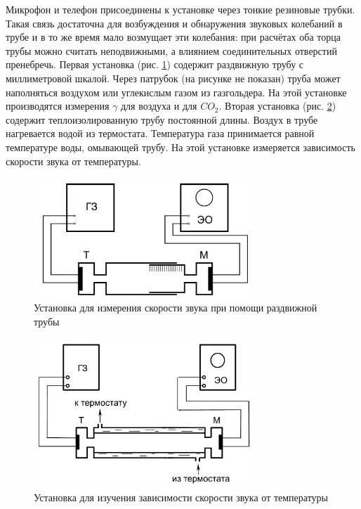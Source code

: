 \documentclass[12pt]{article}
\begin{document}
	
		Микрофон и телефон присоединены к установке через тонкие резиновые трубки. Такая связь достаточна для возбуждения и обнаружения звуковых колебаний в трубе и в то же время мало возмущает эти колебания: при расчётах оба торца трубы можно считать неподвижными, а влиянием соединительных отверстий
		пренебречь. Первая установка (рис. \ref{pic1}) содержит раздвижную трубу с миллиметровой шкалой. Через патрубок (на рисунке не показан) труба может наполняться воздухом или углекислым газом из газгольдера. На этой установке производятся измерения $\gamma$ для воздуха и для $CO_2$. Вторая установка (рис. \ref{pic2}) содержит теплоизолированную трубу постоянной длины. Воздух в трубе нагревается водой из термостата. Температура газа принимается равной температуре воды, омывающей трубу. На этой установке измеряется зависимость скорости звука от температуры.


		\begin{figure}[h!]
			\begin{center}				
			\includegraphics[width=0.75\textwidth]{pic1}
		\end{center}
			\caption{Установка для измерения скорости звука при помощи раздвижной трубы}\label{pic1}

		\end{figure}
	
		\begin{figure}[h!]
			\begin{center}
			\includegraphics[width=0.75\textwidth]{pic2}
			\caption{Установка для изучения зависимости скорости звука от температуры}\label{pic2}
		\end{center}
		\end{figure}
		
\end{document}
